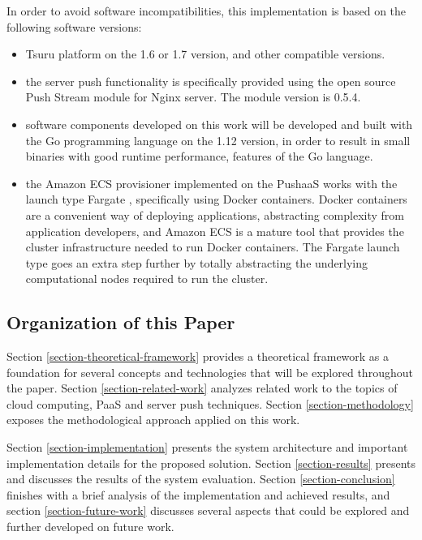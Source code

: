 In order to avoid software incompatibilities, this implementation is based on the following software versions:
\begin{itemize}
    \item Tsuru \cite{siteTsuru} platform on the 1.6 or 1.7 version, and other compatible versions.
    \item the server push functionality is specifically provided using the open source Push Stream module for Nginx server. The module version is 0.5.4.
    \item software components developed on this work will be developed and built with the Go programming language on the 1.12 version, in order to result in small binaries with good runtime performance, features of the Go language.
    \item the Amazon ECS provisioner implemented on the PushaaS works with the launch type Fargate \cite{siteFargate}, specifically using Docker containers. Docker containers are a convenient way of deploying applications, abstracting complexity from application developers, and Amazon ECS is a mature tool that provides the cluster infrastructure needed to run Docker containers. The Fargate launch type goes an extra step further by totally abstracting the underlying computational nodes required to run the cluster.
\end{itemize}


\subsection{Organization of this Paper}

Section \ref{section-theoretical-framework} provides a theoretical framework as a foundation for several concepts and technologies that will be explored throughout the paper. Section \ref{section-related-work} analyzes related work to the topics of cloud computing, PaaS and server push techniques. Section \ref{section-methodology} exposes the methodological approach applied on this work.

Section \ref{section-implementation} presents the system architecture and important implementation details for the proposed solution. Section \ref{section-results} presents and discusses the results of the system evaluation. Section \ref{section-conclusion} finishes with a brief analysis of the implementation and achieved results, and section \ref{section-future-work} discusses several aspects that could be explored and further developed on future work.
